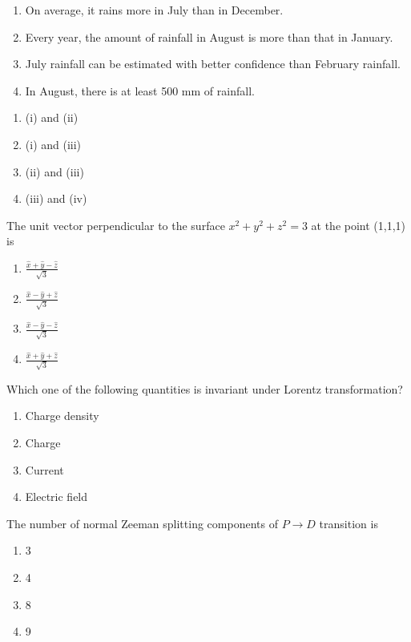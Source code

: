 \begin{enumerate}
    \item On average, it rains more in July than in December.
    \item Every year, the amount of rainfall in August is more than that in January.
    \item July rainfall can be estimated with better confidence than February rainfall.
    \item In August, there is at least 500 mm of rainfall.
\end{enumerate}

\begin{enumerate}
    \item (i) and (ii)
    \item (i) and (iii)
    \item (ii) and (iii)
    \item (iii) and (iv)
\end{enumerate}
 \item The unit vector perpendicular to the surface $x^2 + y^2 + z^2 = 3$ at the point (1,1,1) is
        \begin{enumerate}
            \item $\frac{\hat{x} + \hat{y} - \hat{z}}{\sqrt{3}}$
            \item $\frac{\hat{x} - \hat{y} + \hat{z}}{\sqrt{3}}$
            \item $\frac{\hat{x} - \hat{y} - \hat{z}}{\sqrt{3}}$
            \item $\frac{\hat{x} + \hat{y} + \hat{z}}{\sqrt{3}}$
        \end{enumerate}

    \item Which one of the following quantities is invariant under Lorentz transformation?
        \begin{enumerate}
            \item Charge density
            \item Charge
            \item Current
            \item Electric field
        \end{enumerate}

    \item The number of normal Zeeman splitting components of $P \rightarrow D$ transition is
        \begin{enumerate}
            \item 3
            \item 4
            \item 8
            \item 9
        \end{enumerate}

